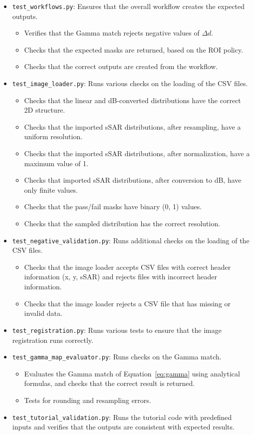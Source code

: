 \documentclass{./class/itisreport}
\begin{document}
\begin{itemize}
\item \verb|test_workflows.py|: Ensures that the overall workflow creates the expected outputs.
	\begin{itemize} 
	\item Verifies that the Gamma match rejects negative values of $\Delta d$.
	\item Checks that the expected masks are returned, based on the ROI policy.
	\item Checks that the correct outputs are created from the workflow.
	\end{itemize}
\item \verb|test_image_loader.py|: Runs various checks on the loading of the CSV files.
	\begin{itemize} 
	\item Checks that the linear and dB-converted distributions have the correct 2D structure.
	\item Checks that the imported sSAR distributions, after resampling, have a uniform resolution.
	\item Checks that the imported sSAR distributions, after normalization, have a maximum value of 1.
	\item Checks that imported sSAR distributions, after conversion to dB, have only finite values.
	\item Checks that the pass/fail masks have binary (0, 1) values.
	\item Checks that the sampled distribution has the correct resolution.
	\end{itemize}
\item \verb|test_negative_validation.py|: Runs additional checks on the loading of the CSV files.
	\begin{itemize}
	\item Checks that the image loader accepts CSV files with correct header information (x, y, sSAR) and rejects files with incorrect header information.
	\item Checks that the image loader rejects a CSV file that has missing or invalid data.
	\end{itemize}
\item \verb|test_registration.py|: Runs various tests to ensure that the image registration runs correctly.
\item \verb|test_gamma_map_evaluator.py|: Runs checks on the Gamma match.
	\begin{itemize} 
	\item Evaluates the Gamma match of Equation~\ref{eq:gamma} using analytical formulas, and checks that the correct result is returned. 
	\item Tests for rounding and resampling errors.
	\end{itemize}
\item \verb|test_tutorial_validation.py|: Runs the tutorial code with predefined inputs and verifies that the outputs are consistent with expected results.
\end{itemize}
\end{document}
